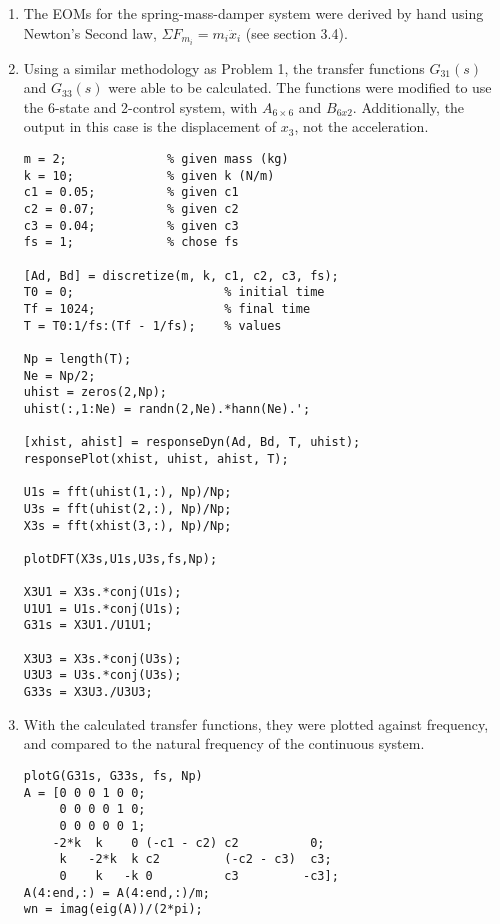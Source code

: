 \documentclass{article}
\begin{document}
\begin{enumerate}
    \item The EOMs for the spring-mass-damper system were derived by hand using Newton's Second law, $\Sigma F_{m_i} = m_i\ddot{x}_i$ (see section 3.4).
    \item Using a similar methodology as Problem 1, the transfer functions $G_{31}(s)$ and $G_{33}(s)$ were able to be calculated. The functions were modified to use the 6-state and 2-control system, with $A_{6\times6}$ and $B_{6x2}$. Additionally, the output in this case is the displacement of $x_3$, not the acceleration.

    \begin{lstlisting}[style=Matlab-editor]
m = 2;              % given mass (kg)
k = 10;             % given k (N/m)
c1 = 0.05;          % given c1 
c2 = 0.07;          % given c2 
c3 = 0.04;          % given c3
fs = 1;             % chose fs

[Ad, Bd] = discretize(m, k, c1, c2, c3, fs);
T0 = 0;                     % initial time
Tf = 1024;                  % final time
T = T0:1/fs:(Tf - 1/fs);    % values

Np = length(T);
Ne = Np/2;
uhist = zeros(2,Np);
uhist(:,1:Ne) = randn(2,Ne).*hann(Ne).';

[xhist, ahist] = responseDyn(Ad, Bd, T, uhist);
responsePlot(xhist, uhist, ahist, T);

U1s = fft(uhist(1,:), Np)/Np;
U3s = fft(uhist(2,:), Np)/Np;
X3s = fft(xhist(3,:), Np)/Np;

plotDFT(X3s,U1s,U3s,fs,Np);

X3U1 = X3s.*conj(U1s);
U1U1 = U1s.*conj(U1s);
G31s = X3U1./U1U1;

X3U3 = X3s.*conj(U3s);
U3U3 = U3s.*conj(U3s);
G33s = X3U3./U3U3;
    \end{lstlisting}

    \item With the calculated transfer functions, they were plotted against frequency, and compared to the natural frequency of the continuous system. 

    \begin{lstlisting}[style=Matlab-editor]
plotG(G31s, G33s, fs, Np)
A = [0 0 0 1 0 0;
     0 0 0 0 1 0;
     0 0 0 0 0 1;
    -2*k  k    0 (-c1 - c2) c2          0;
     k   -2*k  k c2         (-c2 - c3)  c3;
     0    k   -k 0          c3         -c3];
A(4:end,:) = A(4:end,:)/m;
wn = imag(eig(A))/(2*pi);
    \end{lstlisting}
\end{enumerate}
\end{document}
